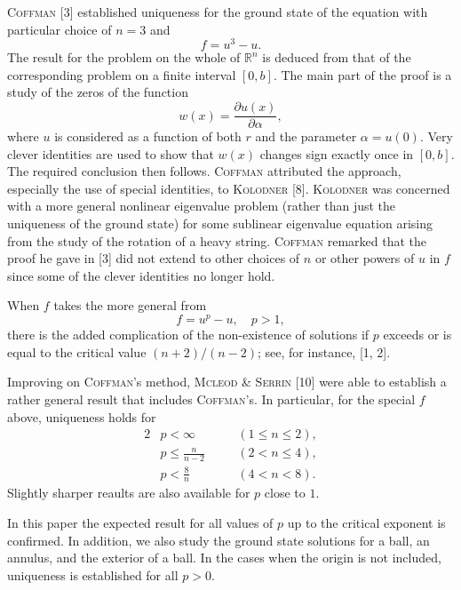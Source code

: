 \textsc{Coffman} [3] established uniqueness for the ground state of the equation
with particular choice of $n=3$ and
\begin{equation}\label{eq:1.5}
  f = u^3 - u.
\end{equation}
The result for the problem on the whole of $\mathbb{R}^n$ is deduced from that
of the corresponding problem on a finite interval $[0,b]$.
The main part of the proof is a study of the zeros of the function
\begin{equation}\label{eq:1.6}
  w(x) = \frac{\partial u(x)}{\partial \alpha},
\end{equation}
where $u$ is considered as a function of both $r$ and the parameter $\alpha=u(0)$.
Very clever identities are used to show that $w(x)$ changes sign exactly once in $[0,b]$.
The required conclusion then follows.
\textsc{Coffman} attributed the approach, especially the use of special identities,
to \textsc{Kolodner} [8]. \textsc{Kolodner} was concerned with a more general 
nonlinear eigenvalue problem (rather than just the uniqueness of the ground state)
for some sublinear eigenvalue equation arising from the study of the rotation of a heavy string.
\textsc{Coffman} remarked that the proof he gave in [3] did not extend to other
choices of $n$ or other powers of $u$ in $f$ since some of the clever identities
no longer hold.

When $f$ takes the more general from
\begin{equation}\label{eq:1.7}
  f = u^p - u,\quad p>1,
\end{equation}
there is the added complication of the non-existence of solutions if $p$ exceeds
or is equal to the critical value $(n+2)/(n-2)$; see, for instance, [1, 2].

Improving on \textsc{Coffman}'s method, \textsc{Mcleod} \& \textsc{Serrin} [10]
were able to establish a rather general result that includes \textsc{Coffman}'s.
In particular, for the special $f$ above, uniqueness holds for
\begin{alignat*}{2}
  & p<\infty & \quad & (1\leq n\leq 2), \\
  & p \leq \frac{n}{n-2} && (2<n\leq 4), \\
  & p<\frac{8}{n} && (4<n<8).
\end{alignat*}
Slightly sharper reaults are also available for $p$ close to $1$.

In this paper the expected result for all values of $p$ up to the critical exponent
is confirmed. In addition, we also study the ground state solutions for a ball,
an annulus, and the exterior of a ball.
In the cases when the origin is not included, uniqueness is established for all $p>0$.

